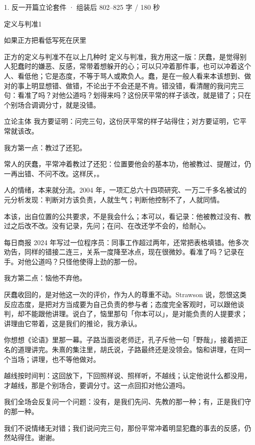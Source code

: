 \documentclass[script,con]{debate}
\begin{document}
\begin{kit}{1. 反一开篇立论}{套件 · 组装后 802–825 字 / 180 秒}
\begin{pick}{定义与判准}{1}
\begin{module}{如果正方把看低写死在厌里}
\end{module}
\begin{fallback}{正方的定义与判准不在以上几种时}
定义与判准，我方用这一版：厌蠢，是觉得别人犯蠢时的嫌恶、反感，常带着想躲开的心；可以只冲着那件事，也可以冲着这个人、看低他；它是态度，不等于骂人或欺负人。蠢，是在一般人看来本该想到、做对的事上明显想错、做错，不论出于不会还是不肯。错没错，看清醒的我问完三句：看准了吗？对他公道吗？划得来吗？这份厌平常的样子该改，就是错了；只在个别场合调调分寸，就是没错。
\end{fallback}
\end{pick}
\begin{fixed}{立论主体}
我方要证明：问完三句，这份厌平常的样子站得住；对方要证明，它平常就该改。

我方第一点：教过了还犯。

常人的厌蠢，平常冲着教过了还犯：位置要他会的基本功，他被教过、提醒过，仍一再出错、不问不改。这样厌，。

人的情绪，本来就分流。2004 年，一项汇总六十四项研究、一万二千多名被试的元分析发现：判断对方该负责，人就生气；判断他控制不了，人就同情。

本该，出自位置的公共要求，不是我会什么；本可以，看记录：他被教过没有、教过之后改不改。没有记录，先问；在问、在改还学不会的，给耐心。

每日商报 2024 年写过一位程序员：同事工作超过两年，还常把表格填错。他多次劝告，同样的错接二连三，关系一度降至冰点，现在很微妙。看准了吗？记录在手。对他公道吗？只怪他使得上劲的那一份。

我方第二点：恼他不弃他。

厌蠢收回的，是对他这一次的评价，作为人的尊重不动。Strawson 说，怨恨这类反应态度，是把对方当成要为自己负责的参与者；态度完全客观时，可以跟他谈判，却不能跟他讲理。说白了，恼里那句「你本可以」，是对能负责的人提要求；讲理由它带着，这是我们的推论，我方承认。

你想想《论语》里那一幕。子路当面说老师迂，孔子斥他一句「野哉」，接着把正名的道理讲完。朱熹的集注里，胡氏说，子路最终还是没领会。恼和讲理，在同一个当场；讲理，也不等他做对。

越线按时间判：这回放下，下回照样说、照样听，不越线；认定他说什么都没用，才越线，那是个别场合，要调分寸。这一点回扣对他公道吗。

我们全场会反复问一个问题：没有，是我们先问、先教的那一种；有，正是我们守的那一种。

我们不说情绪无对错；我们说问完三句，那份平常冲着明显犯蠢的事去的反感，仍然站得住。谢谢。
\end{fixed}
\end{kit}
\end{document}

